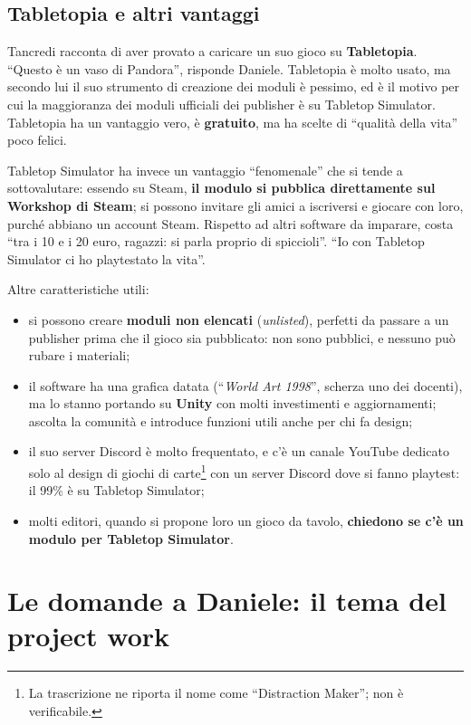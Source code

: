 \subsection{Tabletopia e altri vantaggi}

Tancredi racconta di aver provato a caricare un suo gioco su
\textbf{Tabletopia}. ``Questo è un vaso di Pandora'', risponde Daniele.
Tabletopia è molto usato, ma secondo lui il suo strumento di creazione dei moduli
è pessimo, ed è il motivo per cui la maggioranza dei moduli ufficiali dei
publisher è su Tabletop Simulator. Tabletopia ha un vantaggio vero, è
\textbf{gratuito}, ma ha scelte di ``qualità della vita'' poco felici.

Tabletop Simulator ha invece un vantaggio ``fenomenale'' che si tende a
sottovalutare: essendo su Steam, \textbf{il modulo si pubblica direttamente sul
Workshop di Steam}; si possono invitare gli amici a iscriversi e giocare con
loro, purché abbiano un account Steam. Rispetto ad altri software da imparare,
costa ``tra i 10 e i 20 euro, ragazzi: si parla proprio di spiccioli''. ``Io con
Tabletop Simulator ci ho playtestato la vita''.

Altre caratteristiche utili:
\begin{itemize}
  \item si possono creare \textbf{moduli non elencati} (\emph{unlisted}),
        perfetti da passare a un publisher prima che il gioco sia pubblicato:
        non sono pubblici, e nessuno può rubare i materiali;
  \item il software ha una grafica datata (``\emph{World Art 1998}'', scherza
        uno dei docenti), ma lo stanno portando su \textbf{Unity} con molti investimenti
        e aggiornamenti; ascolta la comunità e introduce funzioni utili anche per
        chi fa design;
  \item il suo server Discord è molto frequentato, e c'è un canale YouTube
        dedicato solo al design di giochi di carte\footnote{La trascrizione ne
        riporta il nome come ``Distraction Maker''; non è verificabile.} con un
        server Discord dove si fanno playtest: il 99\% è su Tabletop Simulator;
  \item molti editori, quando si propone loro un gioco da tavolo,
        \textbf{chiedono se c'è un modulo per Tabletop Simulator}.
\end{itemize}

\section{Le domande a Daniele: il tema del project work}
\label{a1:sec:domande-daniele}

